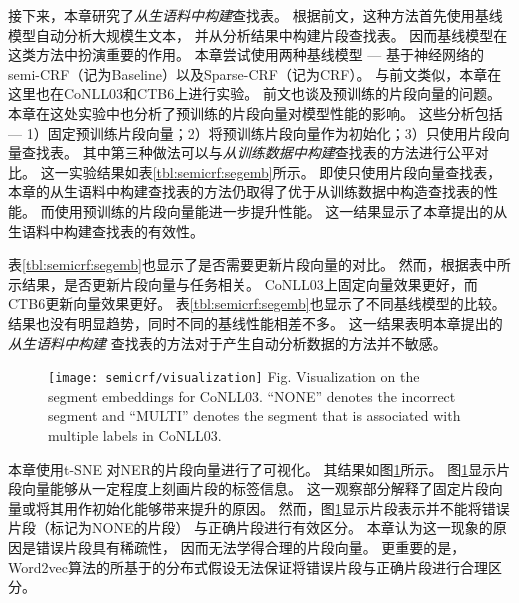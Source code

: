 接下来，本章研究了\textit{从生语料中构建}查找表。
根据前文，这种方法首先使用基线模型自动分析大规模生文本，
并从分析结果中构建片段查找表。
因而基线模型在这类方法中扮演重要的作用。
本章尝试使用两种基线模型 --- 基于神经网络的semi-CRF（记为Baseline）以及Sparse-CRF（记为CRF）。
与前文类似，本章在这里也在CoNLL03和CTB6上进行实验。
前文也谈及预训练的片段向量的问题。
本章在这处实验中也分析了预训练的片段向量对模型性能的影响。
这些分析包括 --- 1）固定预训练片段向量；2）将预训练片段向量作为初始化；3）只使用片段向量查找表。
其中第三种做法可以与\textit{从训练数据中构建}查找表的方法进行公平对比。
这一实验结果如表\ref{tbl:semicrf:segemb}所示。
即使只使用片段向量查找表，本章的从生语料中构建查找表的方法仍取得了优于从训练数据中构造查找表的性能。
而使用预训练的片段向量能进一步提升性能。
这一结果显示了本章提出的从生语料中构建查找表的有效性。

表\ref{tbl:semicrf:segemb}也显示了是否需要更新片段向量的对比。
然而，根据表中所示结果，是否更新片段向量与任务相关。
CoNLL03上固定向量效果更好，而CTB6更新向量效果更好。
表\ref{tbl:semicrf:segemb}也显示了不同基线模型的比较。
结果也没有明显趋势，同时不同的基线性能相差不多。
这一结果表明本章提出的\textit{从生语料中构建}
查找表的方法对于产生自动分析数据的方法并不敏感。

\begin{figure}[t]
	\centering
	\texttt{[image: semicrf/visualization]}
	{Fig. $\!$}{Visualization on the segment embeddings for CoNLL03. 
		``NONE'' denotes the incorrect segment and ``MULTI'' denotes the segment that is associated with multiple labels in CoNLL03.\label{fig:semicrf:visualization}}
\end{figure}

本章使用t-SNE \cite{maaten2008visualizing}对NER的片段向量进行了可视化。
其结果如图\ref{fig:semicrf:visualization}所示。
图\ref{fig:semicrf:visualization}显示片段向量能够从一定程度上刻画片段的标签信息。
这一观察部分解释了固定片段向量或将其用作初始化能够带来提升的原因。
然而，图\ref{fig:semicrf:visualization}显示片段表示并不能将错误片段（标记为NONE的片段）
与正确片段进行有效区分。
本章认为这一现象的原因是错误片段具有稀疏性，
因而无法学得合理的片段向量。
更重要的是，
Word2vec算法的所基于的分布式假设无法保证将错误片段与正确片段进行合理区分。

